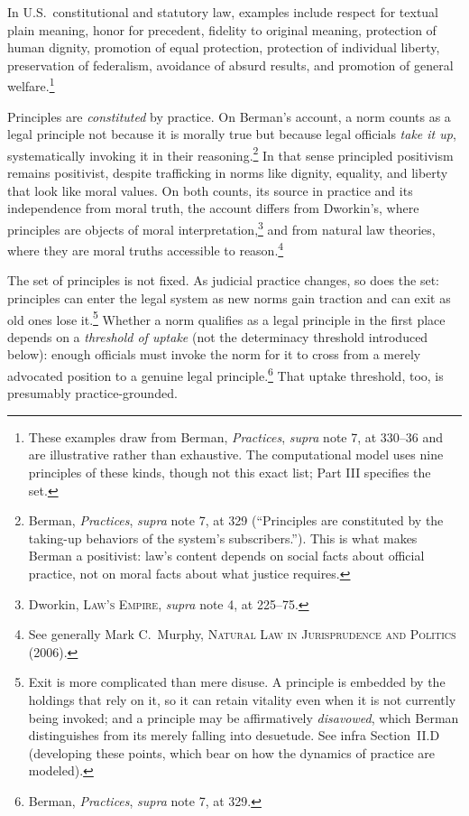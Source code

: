In U.S.\ constitutional and statutory law, examples include respect for
textual plain meaning, honor for precedent, fidelity to original meaning,
protection of human dignity, promotion of equal protection, protection
of individual liberty, preservation of federalism, avoidance of absurd
results, and promotion of general welfare.\footnote{These examples draw
from Berman, \textit{Practices}, \textit{supra} note 7, at 330--36 and are
illustrative rather than
exhaustive. The computational model uses nine principles of these kinds,
though not this exact list; Part III specifies the set.}

Principles are \textit{constituted} by practice. On Berman's account, a norm counts as a legal principle not because it is
morally true but because legal officials \textit{take it up}, systematically
invoking it in their reasoning.\footnote{Berman, \textit{Practices}, \textit{supra} note 7, at 329 (``Principles
are constituted by the taking-up behaviors of the system's
subscribers.''). This is what makes Berman a positivist: law's content
depends on social facts about official practice, not on moral facts about
what justice requires.} In that sense principled positivism remains positivist, despite trafficking
in norms like dignity, equality, and liberty that look like moral values.
On both counts, its source in practice and its independence from moral
truth, the account differs from Dworkin's, where
principles are objects of moral interpretation,\footnote{Dworkin, \textsc{Law's Empire},
\textit{supra} note 4, at 225--75.} and from natural law theories, where
they are moral truths accessible to reason.\footnote{See generally Mark C.\
Murphy, \textsc{Natural Law in Jurisprudence and Politics} (2006).}

The set of principles is not fixed. As judicial practice changes, so does
the set: principles can enter the legal system as new norms gain traction
and can exit as old ones lose it.\footnote{Exit is more
complicated than mere disuse. A principle is embedded by the holdings that
rely on it, so it can retain vitality even when it is not currently being
invoked; and a principle may be affirmatively \textit{disavowed}, which
Berman distinguishes from its merely falling into desuetude. See infra
Section~II.D (developing these points, which bear on how the dynamics of
practice are modeled).} Whether a norm qualifies as a legal principle in
the first place depends on a \textit{threshold of uptake} (not the
determinacy threshold introduced below): enough officials must
invoke the norm for it to cross from a merely advocated position to a genuine
legal principle.\footnote{Berman, \textit{Practices}, \textit{supra} note 7, at 329.} That uptake threshold, too, is presumably practice-grounded.

